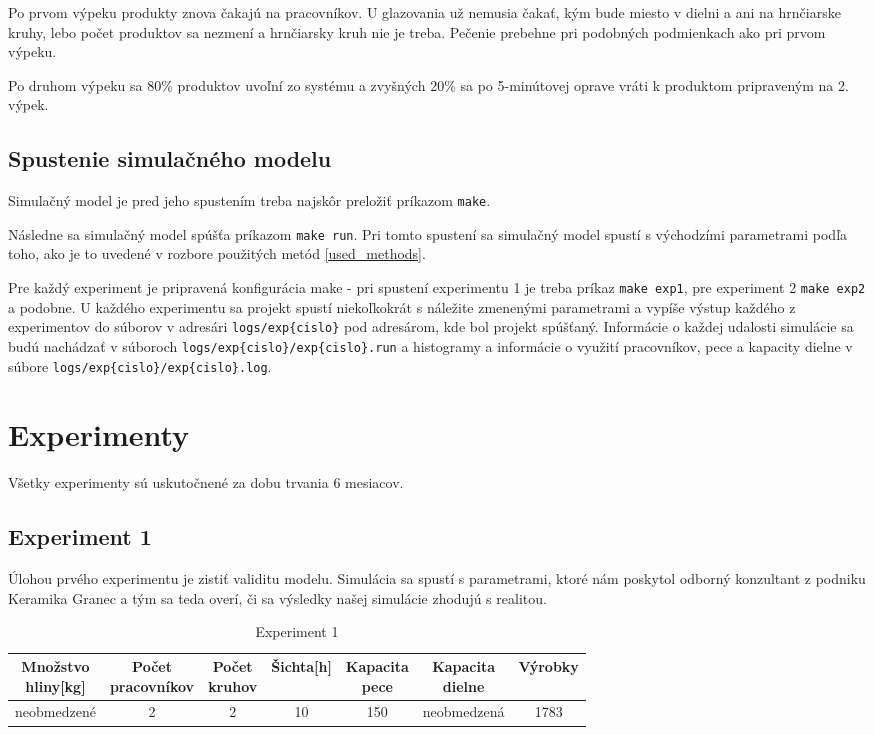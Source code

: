 \documentclass[11pt,a4paper]{article}
\begin{document}
Po prvom výpeku produkty znova čakajú na pracovníkov. U glazovania už nemusia čakať, kým bude miesto v dielni a ani na hrnčiarske kruhy, lebo počet produktov sa nezmení a hrnčiarsky kruh nie je treba. Pečenie prebehne pri podobných podmienkach ako pri prvom výpeku.

Po druhom výpeku sa 80\% produktov uvoľní zo systému a zvyšných 20\% sa po 5-minútovej oprave vráti k produktom pripraveným na 2. výpek.

\subsection{Spustenie simulačného modelu}
Simulačný model je pred jeho spustením treba najskôr preložiť príkazom \texttt{make}.

Následne sa simulačný model spúšťa príkazom \texttt{make run}. Pri tomto spustení sa simulačný model spustí s východzími parametrami podľa toho, ako je to uvedené v rozbore použitých metód \ref{used_methods}.

Pre každý experiment je pripravená konfigurácia make - pri spustení experimentu 1 je treba príkaz \texttt{make exp1}, pre experiment 2 \texttt{make exp2} a podobne. U každého experimentu sa projekt spustí niekoľkokrát s náležite zmenenými parametrami a vypíše výstup každého z experimentov do súborov v adresári \texttt{logs/exp\{cislo\}} pod adresárom, kde bol projekt spúšťaný. Informácie o každej udalosti simulácie sa budú nachádzať v súboroch \texttt{logs/exp\{cislo\}/exp\{cislo\}.run} a histogramy a informácie o využití pracovníkov, pece a kapacity dielne v súbore \texttt{logs/exp\{cislo\}/exp\{cislo\}.log}.

\section{Experimenty}

Všetky experimenty sú uskutočnené za dobu trvania 6 mesiacov.

\subsection{Experiment 1}
Úlohou prvého experimentu je zistiť validitu modelu. Simulácia sa spustí s parametrami, ktoré nám poskytol odborný konzultant z podniku Keramika Granec a tým sa teda overí, či sa výsledky našej simulácie zhodujú s realitou.
\begin{table}[ht]
	\centering
	\begin{tabular}{|c|c|c|c|c|c|c|}
		\hline
		\makecell{Množstvo \\ hliny[kg]} & \makecell{Počet \\ pracovníkov} & \makecell{Počet \\ kruhov} & Šichta[h] & \makecell{Kapacita \\ pece} & \makecell{Kapacita \\ dielne} & Výrobky \\ \hline
		neobmedzené & 2 & 2 & 10 & 150 & neobmedzená & 1783 \\ \hline
	\end{tabular}

	\caption{Experiment 1}
	\label{table:experiment1}
\end{table}
\end{document}
